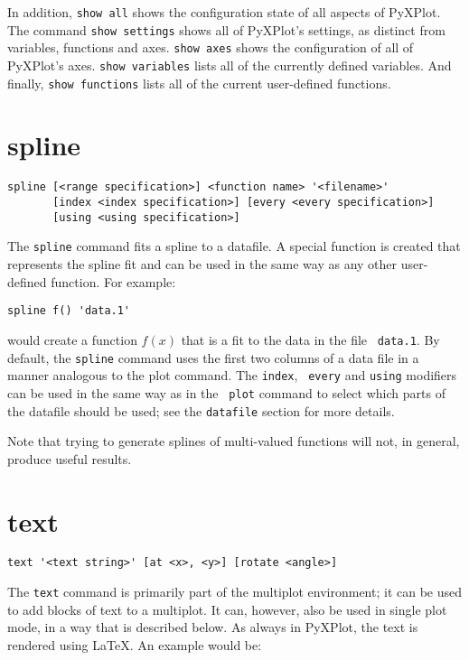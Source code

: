 \documentclass[a4paper,onecolumn,11pt]{book}
\begin{document}
In addition, {\tt show all} shows the configuration state of all aspects of
PyXPlot. The command {\tt show settings} shows all of PyXPlot's settings, as
distinct from variables, functions and axes. {\tt show axes} shows the
configuration of all of PyXPlot's axes. {\tt show variables} lists all of the
currently defined variables. And finally, {\tt show functions} lists all of the
current user-defined functions.


\section{spline}

\begin{verbatim}
spline [<range specification>] <function name> '<filename>' 
       [index <index specification>] [every <every specification>]
       [using <using specification>]
\end{verbatim}

The {\tt spline} command fits a spline to a datafile. A special function is
created that represents the spline fit and can be used in the same way as any
other user-defined function. For example:

\begin{verbatim}
spline f() 'data.1'
\end{verbatim}

\noindent would create a function $f(x)$ that is a fit to the data in the file {\tt
data.1}. By default, the {\tt spline} command uses the first two columns of a
data file in a manner analogous to the plot command. The {\tt index}, {\tt
every} and {\tt using} modifiers can be used in the same way as in the {\tt
plot} command to select which parts of the datafile should be used; see the
{\tt datafile} section for more details.

Note that trying to generate splines of multi-valued functions will not, in
general, produce useful results.

\section{text}

\begin{verbatim}
text '<text string>' [at <x>, <y>] [rotate <angle>]
\end{verbatim}

The {\tt text} command is primarily part of the multiplot environment; it can be
used to add blocks of text to a multiplot. It can, however, also be used in
single plot mode, in a way that is described below. As always in PyXPlot, the
text is rendered using \LaTeX. An example would be:
\end{document}
